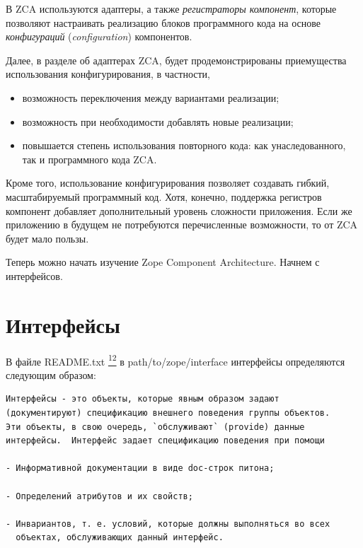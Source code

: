 \documentclass[a4paper,openany,twoside,draft]{book}
\providecommand*{\DUfootnotemark}[3]{%
  \raisebox{1em}{\hypertarget{#1}{}}%
  \hyperlink{#2}{\textsuperscript{#3}}%
}
\begin{document}
В ZCA используются адаптеры, а также \emph{регистраторы компонент}, которые
позволяют настраивать реализацию блоков программного кода на
основе \emph{конфигураций} (\emph{configuration}) компонентов.

Далее, в разделе об адаптерах ZCA, будет продемонстрированы
приемущества использования конфигурирования, в частности,

\begin{itemize}

\item возможность переключения между вариантами реализации;

\item возможность при необходимости добавлять новые реализации;

\item повышается степень использования повторного кода: как
унаследованного, так и программного кода ZCA.

\end{itemize}

Кроме того, использование конфигурирования позволяет создавать гибкий,
масштабируемый программный код.  Хотя, конечно, поддержка регистров
компонент добавляет дополнительный уровень сложности приложения.  Если
же приложению в будущем не потребуются перечисленные возможности, то
от ZCA будет мало пользы.

Теперь можно начать изучение Zope Component Architecture. Начнем с
интерфейсов.


\chapter{Интерфейсы%
  \label{id23}%
}


В файле README.txt\DUfootnotemark{id25}{readmes}{12} в path/to/zope/interface интерфейсы
определяются следующим образом:

\begin{verbatim}
Интерфейсы - это объекты, которые явным образом задают
(документируют) спецификацию внешнего поведения группы объектов.
Эти объекты, в свою очередь, `обслуживают` (provide) данные
интерфейсы.  Интерфейс задает спецификацию поведения при помощи

- Информативной документации в виде doc-строк питона;

- Определений атрибутов и их свойств;

- Инвариантов, т. е. условий, которые должны выполняться во всех
  объектах, обслуживающих данный интерфейс.
\end{verbatim}
\end{document}
